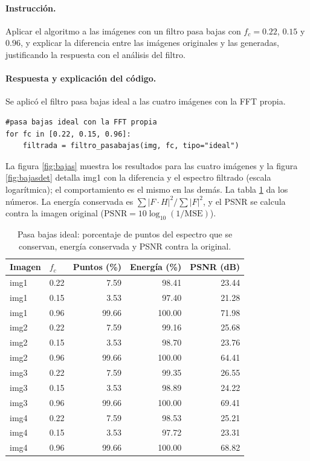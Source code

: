 \documentclass[11pt]{article}
\begin{document}
\paragraph{Instrucción.}
Aplicar el algoritmo a las imágenes con un filtro pasa bajas con $f_c=0.22$, $0.15$ y $0.96$, y explicar la diferencia entre las
imágenes originales y las generadas, justificando la respuesta con el análisis del filtro.

\paragraph{Respuesta y explicación del código.}
Se aplicó el filtro pasa bajas ideal a las cuatro imágenes con la FFT propia.

\begin{lstlisting}
#pasa bajas ideal con la FFT propia
for fc in [0.22, 0.15, 0.96]:
    filtrada = filtro_pasabajas(img, fc, tipo="ideal")
\end{lstlisting}

La figura \ref{fig:bajas} muestra los resultados para las cuatro imágenes y la figura \ref{fig:bajasdet} detalla img1 con la diferencia y el espectro filtrado (escala logarítmica); el comportamiento es el mismo en las demás. La tabla \ref{tab:bajas} da los números.
La energía conservada es $\sum|F\cdot H|^2/\sum|F|^2$, y el PSNR se calcula contra la imagen original
($\mathrm{PSNR}=10\log_{10}(1/\mathrm{MSE})$).

\begin{table}[!htbp]
\centering
\caption{Pasa bajas ideal: porcentaje de puntos del espectro que se conservan, energía conservada y PSNR contra la original.}
\label{tab:bajas}
\begin{tabular}{llrrr}
\hline
\rowcolor{pastelblue}
Imagen & $f_c$ & Puntos (\%) & Energía (\%) & PSNR (dB)\\
\hline
img1 & 0.22 & 7.59 & 98.41 & 23.44\\
img1 & 0.15 & 3.53 & 97.40 & 21.28\\
img1 & 0.96 & 99.66 & 100.00 & 71.98\\
\hline
img2 & 0.22 & 7.59 & 99.16 & 25.68\\
img2 & 0.15 & 3.53 & 98.70 & 23.76\\
img2 & 0.96 & 99.66 & 100.00 & 64.41\\
\hline
img3 & 0.22 & 7.59 & 99.35 & 26.55\\
img3 & 0.15 & 3.53 & 98.89 & 24.22\\
img3 & 0.96 & 99.66 & 100.00 & 69.41\\
\hline
img4 & 0.22 & 7.59 & 98.53 & 25.21\\
img4 & 0.15 & 3.53 & 97.72 & 23.31\\
img4 & 0.96 & 99.66 & 100.00 & 68.82\\
\hline
\end{tabular}
\end{table}
\end{document}
